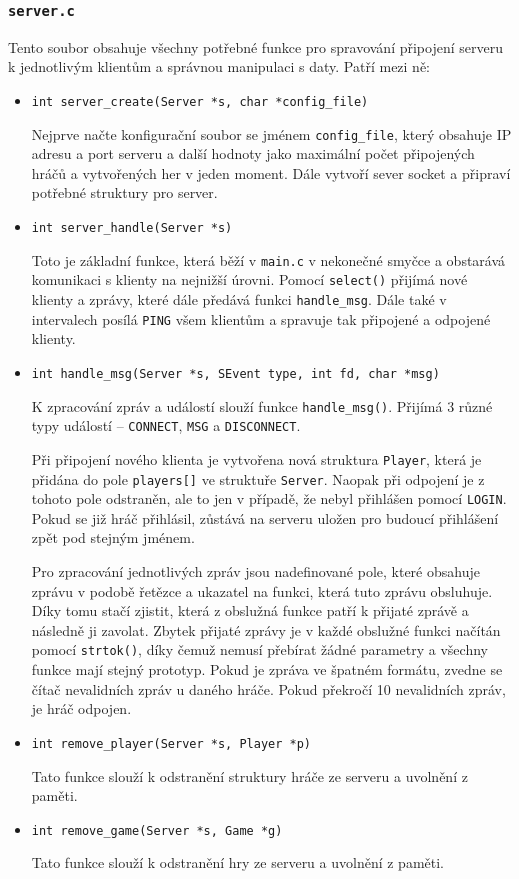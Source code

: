 \documentclass[11pt,a4paper]{article}
\begin{document}
\subsubsection{\texttt{server.c}}
Tento soubor obsahuje všechny potřebné funkce pro spravování připojení serveru k jednotlivým klientům a správnou manipulaci s daty. Patří mezi ně:
\begin{itemize}
	\item \texttt{int server\_create(Server *s, char *config\_file)}

		Nejprve načte konfigurační soubor se jménem \texttt{config\_file}, který obsahuje IP adresu a port serveru a další hodnoty jako maximální počet připojených hráčů a vytvořených her v jeden moment. Dále vytvoří sever socket a připraví potřebné struktury pro server.
	\item \texttt{int server\_handle(Server *s)}

		Toto je základní funkce, která běží v \texttt{main.c} v nekonečné smyčce a obstarává komunikaci s klienty na nejnižší úrovni. Pomocí \texttt{select()} přijímá nové klienty a zprávy, které dále předává funkci \texttt{handle\_msg}. Dále také v intervalech posílá \texttt{PING} všem klientům a spravuje tak připojené a odpojené klienty.
	\item \texttt{int handle\_msg(Server *s, SEvent type, int fd, char *msg)}

		K zpracování zpráv a událostí slouží funkce \texttt{handle\_msg()}. Přijímá 3 různé typy událostí -- \texttt{CONNECT}, \texttt{MSG} a \texttt{DISCONNECT}. 

		Při připojení nového klienta je vytvořena nová struktura \texttt{Player}, která je přidána do pole \texttt{players[]} ve struktuře \texttt{Server}. Naopak při odpojení je z tohoto pole odstraněn, ale to jen v případě, že nebyl přihlášen pomocí \texttt{LOGIN}. Pokud se již hráč přihlásil, zůstává na serveru uložen pro budoucí přihlášení zpět pod stejným jménem.

		Pro zpracování jednotlivých zpráv jsou nadefinované pole, které obsahuje zprávu v podobě řetězce a ukazatel na funkci, která tuto zprávu obsluhuje. Díky tomu stačí zjistit, která z obslužná funkce patří k přijaté zprávě a následně ji zavolat. Zbytek přijaté zprávy je v každé obslužné funkci načítán pomocí \texttt{strtok()}, díky čemuž nemusí přebírat žádné parametry a všechny funkce mají stejný prototyp. Pokud je zpráva ve špatném formátu, zvedne se čítač nevalidních zpráv u daného hráče. Pokud překročí 10 nevalidních zpráv, je hráč odpojen.
	\item \texttt{int remove\_player(Server *s, Player *p)}

		Tato funkce slouží k odstranění struktury hráče ze serveru a uvolnění z paměti.
	\item \texttt{int remove\_game(Server *s, Game *g)}

		Tato funkce slouží k odstranění hry ze serveru a uvolnění z paměti.
\end{itemize}
\end{document}
